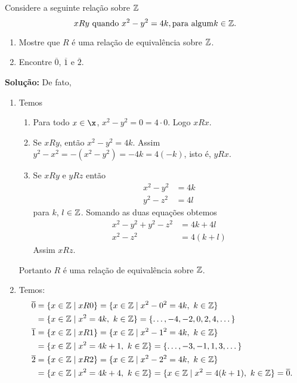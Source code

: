 \documentclass[12pt]{article}
\begin{document}
\vspace{.5cm}

\questao Considere a seguinte relação sobre $\mathbb{Z}$
\[
	xRy \mbox{ quando } x^2 - y^2 = 4k, \mbox{para algum} k \in \mathbb{Z}.
\]

\begin{enumerate}[label={\alph*})]
	\item Mostre que $R$ é uma rela{\c c}{\~a}o de equival{\^e}ncia sobre $\mathbb{Z}$.
	\item Encontre $\overline{0}$, $\overline{1}$ e $\overline{2}$.
\end{enumerate}

\noindent\textbf{Solu\c{c}\~ao:} De fato,
	\begin{enumerate}[label={\alph*})]
		\item Temos
		\begin{enumerate}[label={\roman*})]
			\item Para todo $x \in \x$, $x^2 - y^2 = 0 = 4\cdot 0$. Logo $xRx$.
			\item Se $xRy$, então $x^2 - y^2 = 4k$. Assim $y^2 - x^2 = -(x^2 - y^2) = -4k = 4(-k)$, isto é, $yRx$.
			\item Se $xRy$ e $yRz$ então
			\begin{align}
				x^2 - y^2 &= 4k\label{primeira_equacao}\\
				y^2 - z^2 &= 4l\label{segunda_equacao}
			\end{align}
			para $k$, $l \in \mathbb{Z}$.
			Somando as duas equações obtemos
			\begin{align}\label{terceira_equacao}
				x^2 - y^2 + y^2 - z^2 &= 4k + 4l\\
				x^2 - z^2 &= 4(k + l)
			\end{align}
			Assim $xRz$.
		\end{enumerate}

		Portanto $R$ é uma relação de equivalência sobre $\mathbb{Z}$.

		\item Temos:
		\begin{align*}
			\overline{0} &= \{x \in \mathbb{Z} \mid xR0\} = \{x \in \mathbb{Z} \mid x^2 - 0^2 = 4k,\ k \in \mathbb{Z}\} \\
			&= \{x \in \mathbb{Z} \mid x^2 = 4k, \ k \in \mathbb{Z}\} = \{\dots, -4,-2,0,2,4, \dots\}\\
			\overline{1} &= \{x \in \mathbb{Z} \mid xR1\} = \{x \in \mathbb{Z} \mid x^2 - 1^2 = 4k,\ k \in \mathbb{Z}\} \\
			&= \{x \in \mathbb{Z} \mid x^2 = 4k + 1, \ k \in \mathbb{Z}\} = \{\dots, -3,-1,1,3, \dots\}\\
			\overline{2} &= \{x \in \mathbb{Z} \mid xR2\} = \{x \in \mathbb{Z} \mid x^2 - 2^2 = 4k,\ k \in \mathbb{Z}\} \\
			&= \{x \in \mathbb{Z} \mid x^2 = 4k + 4, \ k \in \mathbb{Z}\} = \{x \in \mathbb{Z} \mid x^2 = 4(k + 1), \ k \in \mathbb{Z}\} = \overline{0}.
		\end{align*}
	\end{enumerate}
\end{document}
